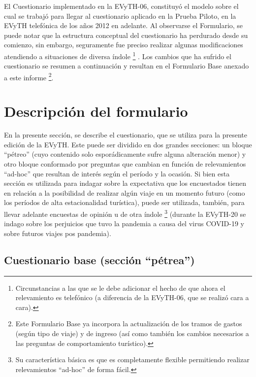 \documentclass[
  openany]{book}
\begin{document}
El Cuestionario implementado en la EVyTH-06, constituyó el modelo sobre el cual se trabajó para llegar al cuestionario aplicado en la Prueba Piloto, en la EVyTH telefónica de los años 2012 en adelante.
Al observarse el Formulario, se puede notar que la estructura conceptual del cuestionario ha perdurado desde su comienzo, sin embargo, seguramente fue preciso realizar algunas modificaciones atendiendo a situaciones de diversa índole \footnote{Circunstancias a las que se le debe adicionar el hecho de que ahora el relevamiento es telefónico (a diferencia de la EVyTH-06, que se realizó cara a cara).} .
Los cambios que ha sufrido el cuestionario se resumen a continuación y resultan en el Formulario Base anexado a este informe \footnote{Este Formulario Base ya incorpora la actualización de los tramos de gastos (según tipo de viaje) y de ingreso (así como también los cambios necesarios a las preguntas de comportamiento turístico).}.

\hypertarget{descripciuxf3n-del-formulario}{%
\section{Descripción del formulario}\label{descripciuxf3n-del-formulario}}

En la presente sección, se describe el cuestionario, que se utiliza para la presente edición de la EVyTH.
Este puede ser dividido en dos grandes secciones: un bloque ``pétreo'' (cuyo contenido solo esporádicamente sufre alguna alteración menor) y otro bloque conformado por preguntas que cambian en función de relevamientos ``ad-hoc'' que resultan de interés según el período y la ocasión.
Si bien esta sección es utilizada para indagar sobre la expectativa que los encuestados tienen en relación a la posibilidad de realizar algún viaje en un momento futuro (como los períodos de alta estacionalidad turística), puede ser utilizada, también, para llevar adelante encuestas de opinión u de otra índole \footnote{Su característica básica es que es completamente flexible permitiendo realizar relevamientos ``ad-hoc'' de forma fácil.} (durante la EVyTH-20 se indago sobre los perjuicios que tuvo la pandemia a causa del virus COVID-19 y sobre futuros viajes pos pandemia).

\hypertarget{cuestionario-base-secciuxf3n-puxe9trea}{%
\subsection{Cuestionario base (sección ``pétrea'')}\label{cuestionario-base-secciuxf3n-puxe9trea}}
\end{document}
